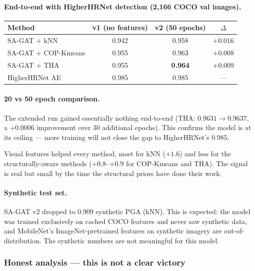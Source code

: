 \paragraph{End-to-end with HigherHRNet detection (2,166 COCO val images).}

\begin{tabular}{lccc}
\hline
\textbf{Method} & \textbf{v1 (no features)} & \textbf{v2 (50 epochs)} & \textbf{$\Delta$} \\
\hline
SA-GAT + kNN & 0.942 & 0.958 & $+0.016$ \\
SA-GAT + COP-Kmeans & 0.955 & 0.963 & $+0.008$ \\
SA-GAT + THA & 0.955 & \textbf{0.964} & $+0.009$ \\
\hline
HigherHRNet AE & 0.985 & 0.985 & --- \\
\hline
\end{tabular}

\vspace{0.5em}

\paragraph{20 vs 50 epoch comparison.} The extended run gained essentially nothing end-to-end (THA: $0.9631 \to 0.9637$, a $+0.0006$ improvement over 30 additional epochs). This confirms the model is at its ceiling --- more training will not close the gap to HigherHRNet's $0.985$.

\vspace{0.5em}

Visual features helped every method, most for kNN ($+1.6$) and less for the structurally-aware methods ($+0.8$--$+0.9$ for COP-Kmeans and THA). The signal is real but small by the time the structural priors have done their work.

\paragraph{Synthetic test set.}

SA-GAT v2 dropped to 0.909 synthetic PGA (kNN). This is expected: the model was trained exclusively on cached COCO features and never saw synthetic data, and MobileNet's ImageNet-pretrained features on synthetic imagery are out-of-distribution. The synthetic numbers are not meaningful for this model.

\subsubsection{Honest analysis --- this is not a clear victory}

